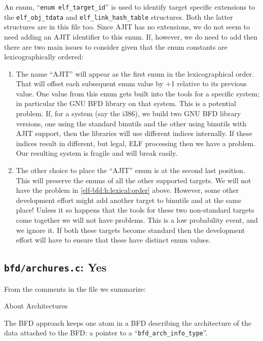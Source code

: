 An enum, ``\texttt{enum elf\_target\_id}''  is used to identify target
specific    extensions    to    the    \texttt{elf\_obj\_tdata}    and
\texttt{elf\_link\_hash\_table}    structures.    Both    the   latter
structures are in this file too.   Since AJIT has no extensions, we do
not seem to need adding an AJIT identifier to this enum.  If, however,
we do need to add then there are two main issues to consider given
that the enum constants are lexicographically ordered:
\begin{enumerate}
\item \label{elf-bfd:h:lexical:order} The name ``AJIT'' will appear as
  the first enum in the  lexicographical order.  That will offset each
  subsequent enum  value by  +1 relative to  its previous  value.  One
  value  from this  enum  gets built  into  the tools  for a  specific
  system; in particular the GNU BFD library on that system.  This is a
  potential problem.   If, for a system  (say the i386),  we build two
  GNU BFD  library versions, one  using the standard binutils  and the
  other using binutils with AJIT  support, then the libraries will use
  different indices internally.  If these indices result in different,
  but legal,  ELF processing  then we have  a problem.   Our resulting
  system is fragile and will break easily.
\item \label{elf-bfd:h:no:lexical:order} The other choice to place the
  ``AJIT'' enum  is at the  second last position.  This  will preserve
  the enums of all the other  supported targets.  We will not have the
  problem in \ref{elf-bfd:h:lexical:order} above.  However, some other
  development effort might  add another target to binutils  and at the
  same  place!  Unless  it so  happens that  the tools  for  these two
  non-standard targets come together  we will not have problems.  This
  is a low probability event, and we ignore it.  If both these targets
  become standard then the development effort will have to ensure that
  these have distinct enum values.
\end{enumerate}


\subsection{\texttt{bfd/archures.c}: Yes}
\label{sec:bfd:archures.c}

From the comments in the file we summarize:

About Architectures

The BFD approach keeps one atom in a BFD describing the architecture
of the data attached to the BFD: a pointer to a
``\texttt{bfd\_arch\_info\_type}''.

